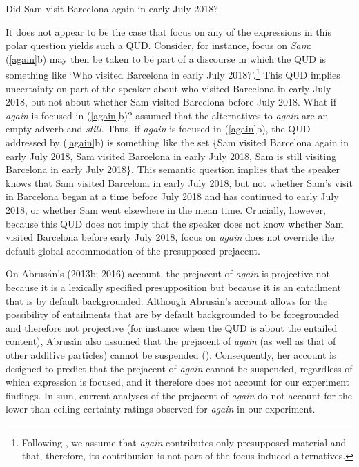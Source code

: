 \documentclass[a4paper,12pt]{article}
\newcommand{\6}{\mbox{$[\hspace*{-.6mm}[$}}
\newcommand{\9}{\mbox{$]\hspace*{-.6mm}]$}}
\begin{document}
\begin{exe}
 Did Sam visit Barcelona again in early July 2018?
\end{exe}
It does not appear to be the case that focus on any of the expressions in this polar question yields such a QUD. Consider, for instance, focus on {\em Sam}: (\ref{again}b) may then be taken to be part of a discourse in which the QUD is something like `Who visited Barcelona in early July 2018?'.\footnote{Following \citealt[fn.4]{beck2006}, we assume that {\em again} contributes only presupposed material and that, therefore, its contribution is not part of the focus-induced alternatives.} This QUD implies uncertainty on part of the speaker about who visited Barcelona in early July 2018, but not about whether Sam visited Barcelona before July 2018. What if {\em again} is focused in (\ref{again}b)? \citet[\S5]{beck2006} assumed that the alternatives to {\em again} are an empty adverb and {\em still}. Thus, if {\em again} is focused in (\ref{again}b), the QUD addressed by (\ref{again}b) is something like the set \{Sam visited Barcelona again in early July 2018, Sam visited Barcelona in early July 2018, Sam is still visiting Barcelona in early July 2018\}. This semantic question implies that the speaker knows that Sam visited Barcelona in early July 2018, but not whether Sam's visit in Barcelona began at a time before July 2018 and has continued to early July 2018, or whether Sam went elsewhere in the mean time. Crucially, however, because this QUD does not imply that the speaker does not know whether Sam visited Barcelona before early July 2018, focus on {\em again} does not override the default global accommodation of the presupposed prejacent. 

On Abrus\'an's (2013b; 2016) account, the prejacent of {\em again} is projective not because it is a lexically specified presupposition but because it is an entailment that is by default backgrounded. Although Abrus\'an's account allows for the possibility of entailments that are by default backgrounded to be foregrounded and therefore not projective (for instance when the QUD is about the entailed content), Abrus\'an also assumed that the prejacent of {\em again} (as well as that of other additive particles) cannot be suspended (\citealt[e.g., 167, 168, \S2.2]{abrusan2016}). Consequently, her account is designed to predict that the prejacent of {\em again} cannot be suspended, regardless of which expression is focused, and it therefore does not account for our experiment findings. In sum, current analyses of the prejacent of {\em again} do not account for the lower-than-ceiling certainty ratings observed for {\em again} in our experiment.
\end{document}
